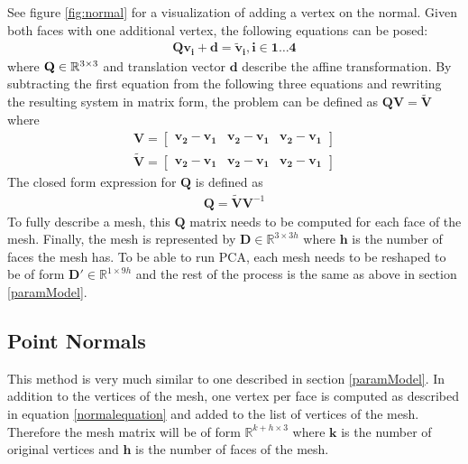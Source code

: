 See figure \ref{fig:normal} for a visualization of adding a vertex on the normal.
Given both faces with one additional vertex, the following equations can be posed:
\begin{gather}
 \mathbf{Q}\mathbf{v_i}+\mathbf{d} = \mathbf{\tilde{v}_i}, \mathbf{i} \in \mathbf{1} \dotsc \mathbf{4}
\end{gather}
where $\mathbf{Q} \in \mathbb{R}^{3 \times 3}$ and translation vector $\mathbf{d}$ describe the affine transformation. By subtracting the first equation from the following three equations and rewriting the resulting system in matrix form, the problem can be defined as $\mathbf{Q}\mathbf{V}=\mathbf{\tilde{V}}$ where
\begin{gather}
  \mathbf{V} =
  \begin{bmatrix}
   \mathbf{v_2} - \mathbf{v_1}&\mathbf{v_2} - \mathbf{v_1}&\mathbf{v_2} - \mathbf{v_1}
  \end{bmatrix} \\
  \mathbf{\tilde{V}} =
  \begin{bmatrix}
   \mathbf{\mathbf{v}_2} - \mathbf{\mathbf{v}_1}&\mathbf{\mathbf{v}_2} - \mathbf{\mathbf{v}_1}&\mathbf{\mathbf{v}_2} - \mathbf{\mathbf{v}_1}
  \end{bmatrix}
\end{gather}
The closed form expression for $\mathbf{Q}$ is defined as
\begin{gather}
  \mathbf{Q}=\mathbf{\tilde{V}}\mathbf{V}^{-1}
\end{gather}
To fully describe a mesh, this $\mathbf{Q}$ matrix needs to be computed for each face of the mesh. Finally, the mesh is represented by $\mathbf{D} \in \mathbb{R}^{3 \times 3h}$ where $\mathbf{h}$ is the number of faces the mesh has. To be able to run PCA, each mesh needs to be reshaped to be of form $\mathbf{D'} \in \mathbb{R}^{1 \times 9h}$ and the rest of the process is the same as above in section \ref{paramModel}.

\subsection{Point Normals}
This method is very much similar to one described in section \ref{paramModel}. In addition to the vertices of the mesh, one vertex per face is computed as described in equation \ref{normalequation} and added to the list of vertices of the mesh. Therefore the mesh matrix will be of form $\mathbb{R}^{k+h \times 3}$ where $\mathbf{k}$ is the number of original vertices and $\mathbf{h}$ is the number of faces of the mesh.

